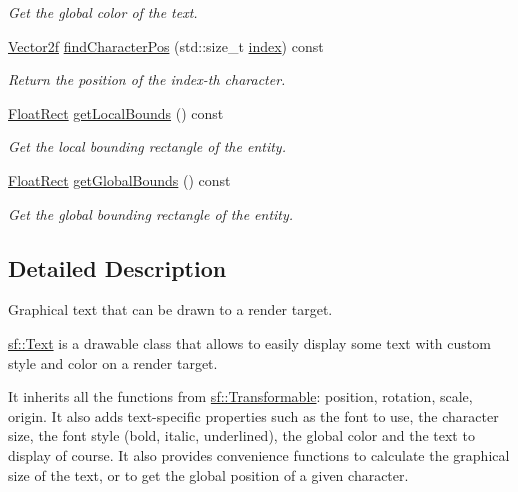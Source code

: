 \begin{DoxyCompactItemize}
\begin{DoxyCompactList}\small\item\em Get the global color of the text. \end{DoxyCompactList}\item 
\hyperlink{namespacesf_acf03098c2577b869e2fa6836cc48f1a0}{Vector2f} \hyperlink{classsf_1_1_text_adf120ed4159e43daa782b17fea23ea82}{find\-Character\-Pos} (std\-::size\-\_\-t \hyperlink{gl3_8h_a57f14e05b1900f16a2da82ade47d0c6d}{index}) const 
\begin{DoxyCompactList}\small\item\em Return the position of the {\itshape index-\/th} character. \end{DoxyCompactList}\item 
\hyperlink{namespacesf_aed4e58f586b2eed2621c0365d0b7554e}{Float\-Rect} \hyperlink{classsf_1_1_text_a8a766ea03a1b8899cd1542765771a4ae}{get\-Local\-Bounds} () const 
\begin{DoxyCompactList}\small\item\em Get the local bounding rectangle of the entity. \end{DoxyCompactList}\item 
\hyperlink{namespacesf_aed4e58f586b2eed2621c0365d0b7554e}{Float\-Rect} \hyperlink{classsf_1_1_text_a95d732f58bd12bf7ec388b106f3729ba}{get\-Global\-Bounds} () const 
\begin{DoxyCompactList}\small\item\em Get the global bounding rectangle of the entity. \end{DoxyCompactList}\end{DoxyCompactItemize}


\subsection{Detailed Description}
Graphical text that can be drawn to a render target. 

\hyperlink{classsf_1_1_text}{sf\-::\-Text} is a drawable class that allows to easily display some text with custom style and color on a render target.

It inherits all the functions from \hyperlink{classsf_1_1_transformable}{sf\-::\-Transformable}\-: position, rotation, scale, origin. It also adds text-\/specific properties such as the font to use, the character size, the font style (bold, italic, underlined), the global color and the text to display of course. It also provides convenience functions to calculate the graphical size of the text, or to get the global position of a given character.

